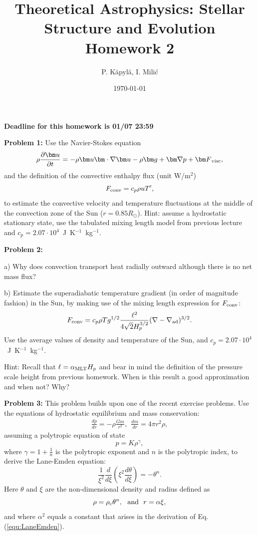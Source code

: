\documentclass[12pt]{article}
\title{Theoretical Astrophysics: Stellar Structure and Evolution\\
Homework 2}
\author{P. K\"{a}pyl\"{a}, I. Mili\'{c}}
\date{\today}
\newcommand{\Fconv}{F_{\rm conv}}
\begin{document}
\maketitle

\textbf{Deadline for this homework is \textbf{01/07 23:59}}

{\bf Problem 1:} Use the Navier-Stokes equation
\begin{equation}
\rho\frac{\partial {\bm u}}{\partial t} = - \rho{\bm u}\bm\cdot\nabla{\bm u} - \rho {\bm g} + \bm\nabla p + {\bm F}_{\rm visc},
\end{equation}
and the definition of the convective enthalpy flux (unit W/m$^2$)
\begin{equation}
F_{\rm conv} = c_p \rho u T',
\end{equation}
to estimate the convective velocity and temperature fluctuations at
the middle of the convection zone of the Sun ($r=0.85R_\odot$). Hint:
assume a hydrostatic stationary state, use the tabulated mixing length
model from previous lecture and $c_p =
2.07\cdot10^4$~J~K$^{-1}$~kg$^{-1}$.


{\bf Problem 2:} 

a) Why does convection transport heat radially outward although there
is no net mass flux?

b) Estimate the superadiabatic temperature gradient (in order of
magnitude fashion) in the Sun, by making use of the mixing length
expression for $\Fconv$:
\begin{equation}
  \Fconv = c_p \rho T g^{1/2} \frac{\ell^2}{4\sqrt{2}H_p^{3/2}} (\nabla-\nabla_{\rm ad})^{3/2}.
\end{equation}
Use the average values of density and temperature of the Sun, and $c_p
= 2.07\cdot10^4$~J~K$^{-1}$~kg$^{-1}$. 

Hint: Recall that $\ell =
\alpha_{\rm MLT}H_p$ and bear in mind the definition of the pressure
scale height from previous homework. When is this result a good
approximation and when not? Why?


{\bf Problem 3:} This problem builds upon one of the recent exercise problems. Use the equations of hydrostatic equilibrium and mass
conservation:
\begin{eqnarray}
  \frac{dp}{dr} = -\rho \frac{Gm}{r^2},\ \ \frac{dm}{dr} = 4\pi r^2\rho, 
\end{eqnarray}
assuming a polytropic equation of state
\begin{equation}
p = K \rho^\gamma,
\end{equation}
where $\gamma = 1 + \frac{1}{n}$ is the polytropic exponent and $n$ is
the polytropic index, to derive the Lane-Emden equation:
\begin{equation}
\frac{1}{\xi^2} \frac{d}{d\xi} \left(\xi^2 \frac{d\theta}{d\xi} \right) = -\theta^n.\label{equ:LaneEmden}
\end{equation}
Here $\theta$ and $\xi$ are the non-dimensional density and radius
defined as
\begin{equation}
\rho = \rho_{\rm c} \theta^n, \ \ \mbox{and}\ \ r = \alpha\xi,
\end{equation}
and where $\alpha^2$ equals a constant that arises in the derivation
of Eq.(\ref{equ:LaneEmden}).
\end{document}
